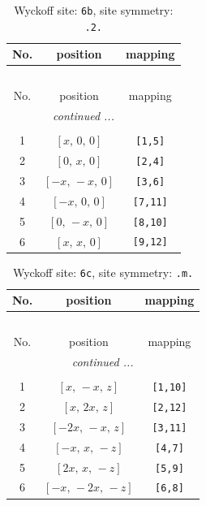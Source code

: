 \documentclass[fleqn,8pt]{jsarticle}
\begin{document}
\begin{longtable}{ccc}
\caption{Wyckoff site: {\tt 6b}, site symmetry: {\tt .2.}}
 \\
 \hline \hline
No. & position & mapping \\ \hline \endfirsthead

\multicolumn{2}{l}{\tablename\ \thetable{}} \\
 \hline \hline
No. & position & mapping \\ \hline \endhead

 \hline \hline
\multicolumn{2}{r}{\footnotesize\it continued ...} \\ \endfoot

 \hline \hline
\multicolumn{2}{r}{} \\ \endlastfoot

1 & $\left[ x,\, 0,\, 0 \right]$ & {\tt [1,5]} \\ \hline
2 & $\left[ 0,\, x,\, 0 \right]$ & {\tt [2,4]} \\ \hline
3 & $\left[ - x,\, - x,\, 0 \right]$ & {\tt [3,6]} \\ \hline
4 & $\left[ - x,\, 0,\, 0 \right]$ & {\tt [7,11]} \\ \hline
5 & $\left[ 0,\, - x,\, 0 \right]$ & {\tt [8,10]} \\ \hline
6 & $\left[ x,\, x,\, 0 \right]$ & {\tt [9,12]} \\
\end{longtable}
\renewcommand{\arraystretch}{1.2}
\begin{longtable}{ccc}
\caption{Wyckoff site: {\tt 6c}, site symmetry: {\tt .m.}}
 \\
 \hline \hline
No. & position & mapping \\ \hline \endfirsthead

\multicolumn{2}{l}{\tablename\ \thetable{}} \\
 \hline \hline
No. & position & mapping \\ \hline \endhead

 \hline \hline
\multicolumn{2}{r}{\footnotesize\it continued ...} \\ \endfoot

 \hline \hline
\multicolumn{2}{r}{} \\ \endlastfoot

1 & $\left[ x,\, - x,\, z \right]$ & {\tt [1,10]} \\ \hline
2 & $\left[ x,\, 2 x,\, z \right]$ & {\tt [2,12]} \\ \hline
3 & $\left[ - 2 x,\, - x,\, z \right]$ & {\tt [3,11]} \\ \hline
4 & $\left[ - x,\, x,\, - z \right]$ & {\tt [4,7]} \\ \hline
5 & $\left[ 2 x,\, x,\, - z \right]$ & {\tt [5,9]} \\ \hline
6 & $\left[ - x,\, - 2 x,\, - z \right]$ & {\tt [6,8]} \\
\end{longtable}
\end{document}
